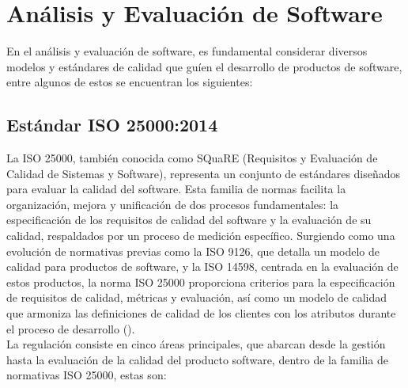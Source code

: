 \section{Análisis y Evaluación de Software}
En el análisis y evaluación de software, es fundamental considerar diversos modelos y estándares de calidad que guíen el desarrollo de productos de software, entre algunos de estos se encuentran los siguientes: 
\subsection{Estándar ISO 25000:2014}
La ISO 25000, también conocida como SQuaRE (Requisitos y Evaluación de Calidad de Sistemas y Software), representa un conjunto de estándares diseñados para evaluar la calidad del software. Esta familia de normas facilita la organización, mejora y unificación de dos procesos fundamentales: la especificación de los requisitos de calidad del software y la evaluación de su calidad, respaldados por un proceso de medición específico. Surgiendo como una evolución de normativas previas como la ISO 9126, que detalla un modelo de calidad para productos de software, y la ISO 14598, centrada en la evaluación de estos productos, la norma ISO 25000 proporciona criterios para la especificación de requisitos de calidad, métricas y evaluación, así como un modelo de calidad que armoniza las definiciones de calidad de los clientes con los atributos durante el proceso de desarrollo (\cite{iso25000}).\\ \indent
La regulación consiste en cinco áreas principales, que abarcan desde la gestión hasta la evaluación de la calidad del producto software, dentro de la familia de normativas ISO 25000, estas son:

